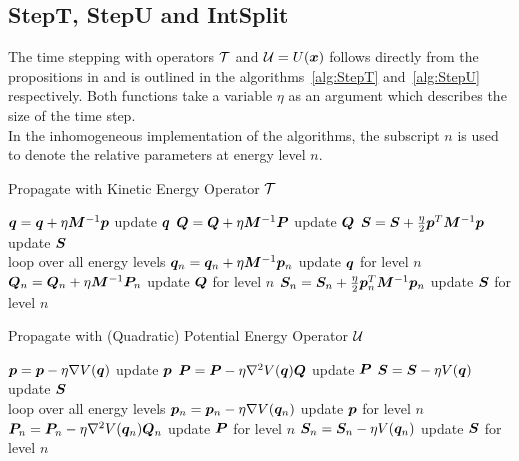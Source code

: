 \subsection{StepT, StepU and IntSplit}
\label{subsec:tuintsplit}
%
The time stepping with operators $\mathcal{T}$ and $\mathcal{U} = U(\bm{x})$ follows directly from the propositions in \cite{FGL_semiclassical_dynamics} and is outlined in the algorithms~\ref{alg:StepT} and~\ref{alg:StepU} respectively.
Both functions take a variable $\eta$ as an argument which describes the size of the time step. \\
In the inhomogeneous implementation of the algorithms, the subscript $n$ is used to denote the relative parameters at energy level $n$.
\par\medskip
%
\begin{algorithm}[h]
	\caption{Propagate with Kinetic Energy Operator $\mathcal{T}$}
	\label{alg:StepT}
	\begin{algorithmic}
	\State
		\State
		\State $\bm{q} = \bm{q} + \eta \bm{M}^{-1} \bm{p}$
		\Comment update $\bm{q}$
		\State $\bm{Q} = \bm{Q} + \eta \bm{M}^{-1} \bm{P}$
		\Comment update $\bm{Q}$
		\State $\bm{S} = \bm{S} + \frac{\eta}{2} \bm{p}^T \bm{M}^{-1} \bm{p}$
		\Comment update $\bm{S}$
		\State
	\EndProcedure
		\\\hrulefill
	\State
		\State
		\Comment loop over all energy levels
			\State $\bm{q}_n = \bm{q}_n + \eta \bm{M}^{-1} \bm{p}_n$
			\Comment update $\bm{q}$ for level $n$
			\State $\bm{Q}_n = \bm{Q}_n + \eta \bm{M}^{-1} \bm{P}_n$
			\Comment update $\bm{Q}$ for level $n$
			\State $\bm{S}_n = \bm{S}_n + \frac{\eta}{2} \bm{p}_n^T \bm{M}^{-1} \bm{p}_n$
			\Comment update $\bm{S}$ for level $n$
		\EndFor
		\State
	\EndProcedure
	\end{algorithmic}
\end{algorithm}
%
\begin{algorithm}[h]
	\caption{Propagate with (Quadratic) Potential Energy Operator $\mathcal{U}$}
	\label{alg:StepU}
	\begin{algorithmic}
	\State
		\Procedure{StepU[homogeneous]}{$\eta$}
		\State
		\State $\bm{p} = \bm{p} - \eta \nabla V (\bm{q})$
		\Comment update $\bm{p}$
		\State $\bm{P} = \bm{P} - \eta \nabla^2 V (\bm{q}) \bm{Q}$
		\Comment update $\bm{P}$
		\State $\bm{S} = \bm{S} - \eta V (\bm{q})$
		\Comment update $\bm{S}$
		\State
	\EndProcedure
		\\\hrulefill
	\State
		\Procedure{StepU[inhomogeneous]}{$\eta$}
		\State
		\For{$n=1,...,N$}
		\Comment loop over all energy levels
			\State $\bm{p}_n = \bm{p}_n - \eta \nabla V (\bm{q}_n)$
			\Comment update $\bm{p}$ for level $n$
			\State $\bm{P}_n = \bm{P}_n - \eta \nabla^2 V (\bm{q}_n) \bm{Q}_n$
			\Comment update $\bm{P}$ for level $n$
			\State $\bm{S}_n = \bm{S}_n - \eta V (\bm{q}_n)$
			\Comment update $\bm{S}$ for level $n$
		\EndFor
		\State
	\EndProcedure
	\end{algorithmic}
\end{algorithm}
